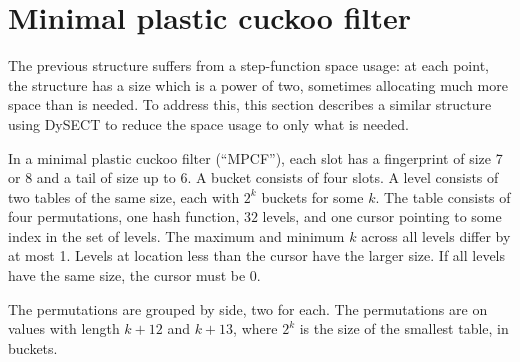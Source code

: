 \documentclass[letterpaper, 11pt]{article}
\newcommand{\ints}{\mathbb{Z}}
\begin{document}




\section{Minimal plastic cuckoo filter}
\label{mpcf}

The previous structure suffers from a step-function space usage:
at each point, the structure has a size which is a power of two, sometimes allocating much more space than is needed.
To address this, this section describes a similar structure using DySECT to reduce the space usage to only what is needed.~\cite{dysect}

In a minimal plastic cuckoo filter (``MPCF''), each slot has a fingerprint of size 7 or 8 and a tail of size up to 6.
A bucket consists of four slots.
A level consists of two tables of the same size, each with $2^k$ buckets for some $k$.
The table consists of four permutations, one hash function, $32$ levels, and one cursor pointing to some index in the set of levels.
The maximum and minimum $k$ across all levels differ by at most 1.
Levels at location less than the cursor have the larger size.
If all levels have the same size, the cursor must be 0.

The permutations are grouped by side, two for each.
The permutations are on values with length $k + 12$ and $k + 13$, where $2^k$ is the size of the smallest table, in buckets.
\end{document}
